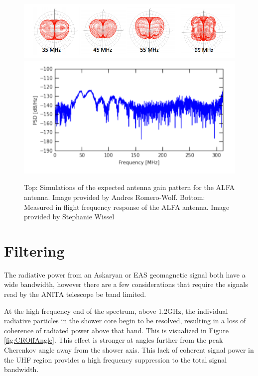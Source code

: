 \begin{figure}
\centering
	\includegraphics[width=\textwidth]{figures/ALFA_gainPattern}
	\includegraphics[width=\textwidth]{figures/ALFA_gain}
	\caption{Top: Simulations of the expected antenna gain  pattern for the ALFA antenna.  Image provided by Andres Romero-Wolf.  Bottom: Measured in flight frequency response of the ALFA antenna.  Image provided by Stephanie Wissel}
	\label{fig:ALFA}
\end{figure}


\section{Filtering}
		The radiative power from an Askaryan or EAS geomagnetic signal both have a wide bandwidth, however there are a few considerations that require the signals read by the ANITA telescope be band limited.
		
		At the high frequency end of the spectrum, above 1.2GHz, the individual radiative particles in the shower core begin to be resolved, resulting in a loss of coherence of radiated power above that band.  This is visualized in Figure \ref{fig:CROffAngle}.  This effect is stronger at angles further from the peak Cherenkov angle away from the shower axis.\cite{PhysRevD.84.103003}  This lack of coherent signal power in the UHF region provides a high frequency suppression to the total signal bandwidth.



